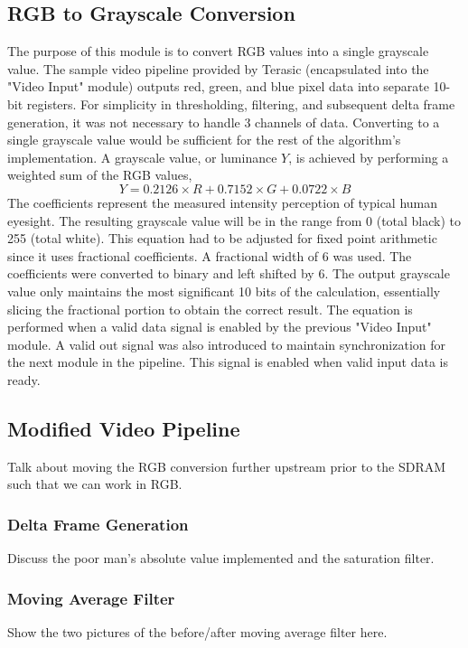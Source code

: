 \documentclass[11pt]{article} %
\begin{document}
\subsection{RGB to Grayscale Conversion}
The purpose of this module is to convert RGB values into a single grayscale value. The sample video pipeline provided by Terasic (encapsulated into the "Video Input" module) outputs red, green, and blue pixel data into separate 10-bit registers. For simplicity in thresholding, filtering, and subsequent delta frame generation, it was not necessary to handle 3 channels of data. Converting to a single grayscale value would be sufficient for the rest of the algorithm's implementation. A grayscale value, or luminance $Y$, is achieved by performing a weighted sum of the RGB values,
\begin{equation}
Y =  0.2126\times R + 0.7152\times G + 0.0722\times B
\end{equation}
The coefficients represent the measured intensity perception of typical human eyesight. The resulting grayscale value will be in the range from 0 (total black) to 255 (total white). This equation had to be adjusted for fixed point arithmetic since it uses fractional coefficients. A fractional width of 6 was used. The coefficients were converted to binary and left shifted by 6. The output grayscale value only maintains the most significant 10 bits of the calculation, essentially slicing the fractional portion to obtain the correct result. The equation is performed when a valid data signal is enabled by the previous "Video Input" module. A valid out signal was also introduced to maintain synchronization for the next module in the pipeline. This signal is enabled when valid input data is ready. 

\subsection{Modified Video Pipeline}
Talk about moving the RGB conversion further upstream prior to the SDRAM such that we can work in RGB.
\subsubsection{Delta Frame Generation}
Discuss the poor man's absolute value implemented and the saturation filter.
\subsubsection{Moving Average Filter}
Show the two pictures of the before/after moving average filter here.
\end{document}
